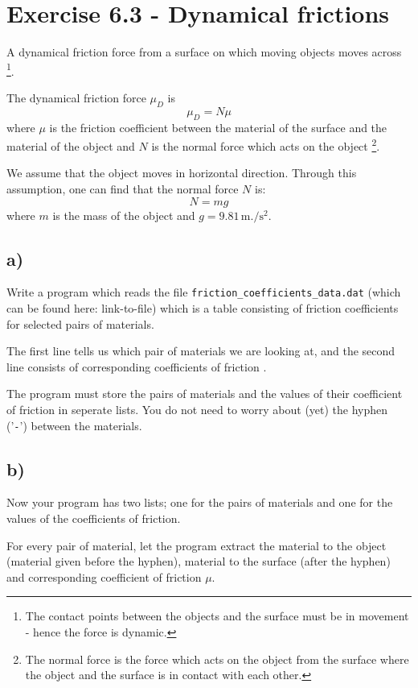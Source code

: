 \documentclass[10pt,a4paper]{article}
\begin{document}
\section*{Exercise 6.3 - Dynamical frictions}
A dynamical friction force from a surface on which moving objects moves across \footnote{The contact points between the objects and the surface must be in movement - hence the force is dynamic.}.  

The dynamical friction force $\mu_D$  is
\[
\mu_D = N\mu
\]
where $\mu$ is the friction coefficient between the material of the surface and the material of the object and $N$ is the normal force which acts on the object \footnote{The normal force is the force which acts on the object from the surface where the object and the surface is in contact with each other.}.

We assume that the object moves in horizontal direction. Through this assumption, one can find that the normal force $N$ is:
\[
N = mg
\]
where $m$ is the mass of the object and $g = 9.81\,\si{\meter.\per\square\second}$. 

\subsection*{a)}
Write a program which reads the file \texttt{friction\_coefficients\_data.dat} (which can be found here: link-to-file) which is a table consisting of friction coefficients for selected pairs of materials. 

The first line tells us which pair of materials we are looking at, and the second line consists of corresponding coefficients of friction .

The program must store the pairs of materials and the values of their coefficient of friction in seperate lists. You do not need to worry about (yet) the hyphen ('\texttt{-}') between the materials. 
\subsection*{b)}
Now your program has two lists; one for the pairs of materials and one for the values of the coefficients of friction. 

For every pair of material, let the program extract the material to the object (material given before the hyphen), material to the surface (after the hyphen) and corresponding coefficient of friction $\mu$. 
\end{document}
